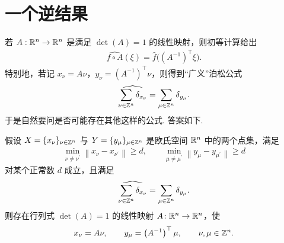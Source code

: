 \section{一个逆结果}

若 $A: \mathbb{R}^n \to \mathbb{R}^n$ 是满足 $\det(A) = 1$ 的线性映射，则初等计算给出
\begin{align*}
  \widehat{f\circ A}(\xi)=\widehat{f}\bigl((A^{-1})^{\mathsf{T}}\xi\bigr).
\end{align*}
特别地，若记 $x_\nu = A\nu$，$y_\nu = (A^{-1})^\top\nu$，则得到``广义''泊松公式
\begin{equation}\label{eq:7.2}
  \widehat{\sum_{\nu\in\mathbb{Z}^{n}}\delta_{x_\nu}}=\sum_{\mu\in\mathbb{Z}^{n}}\delta_{y_\mu}.
\end{equation}
于是自然要问是否可能存在其他这样的公式. 答案如下.

\begin{theorem}\label{thm:7.1}
假设 $X = \{x_\nu\}_{\nu \in \mathbb{Z}^n}$ 与 $Y = \{y_\mu\}_{\mu \in \mathbb{Z}^n}$ 是欧氏空间 $\mathbb{R}^n$ 中的两个点集，满足
\begin{align*}
  \min_{\nu\neq\nu^{\prime}}\left\|x_{\nu}-x_{\nu^{\prime}}\right\|\geq d,\qquad
  \min_{\mu\neq\mu^{\prime}}\left\|y_{\mu}-y_{\mu^{\prime}}\right\|\geq d
\end{align*}
对某个正常数 $d$ 成立，且满足
\begin{align*}
  \widehat{\sum_{\nu\in\mathbb{Z}^{n}}\delta_{x_{\nu}}}=\sum_{\mu\in\mathbb{Z}^{n}}\delta_{y_\mu}.
\end{align*}
则存在行列式 $\det(A) = 1$ 的线性映射 $A\colon \mathbb{R}^n \to \mathbb{R}^n$，使
\begin{align*}
  x_{\nu}=A\nu,\qquad y_{\mu}=\left(A^{-1}\right)^{\top}\mu,\qquad \nu,\mu\in\mathbb{Z}^{n}.
\end{align*}
\end{theorem}

